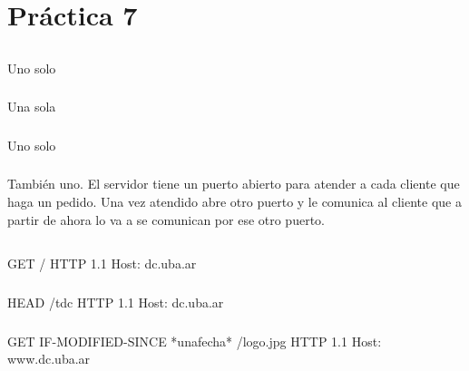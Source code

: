 \section{Práctica 7}

\subsection{}
\subsubsection{}
Uno solo

\subsubsection{}
Una sola

\subsubsection{}
Uno solo

\subsubsection{}
También uno. El servidor tiene un puerto abierto para atender a cada cliente que haga un pedido. Una vez atendido abre otro puerto y le comunica al cliente que a partir de ahora lo va a se comunican por ese otro puerto.

\subsection{}
\subsubsection{}
GET / HTTP 1.1 Host: dc.uba.ar

\subsubsection{}
HEAD /tdc HTTP 1.1 Host: dc.uba.ar

\subsubsection{}
GET IF-MODIFIED-SINCE *unafecha* /logo.jpg HTTP 1.1 Host: www.dc.uba.ar

\subsection{}
